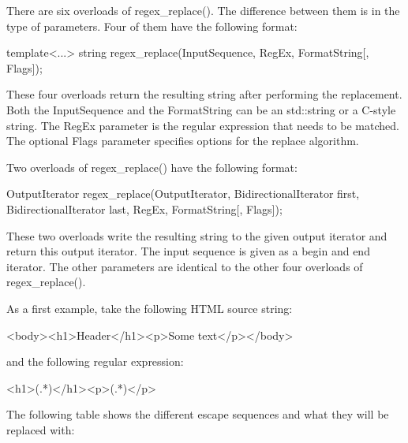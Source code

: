 There are six overloads of regex\_replace(). The difference between them is in the type of parameters. Four of them have the following format:

\begin{cpp}
template<...>
string regex_replace(InputSequence, RegEx, FormatString[, Flags]);
\end{cpp}

These four overloads return the resulting string after performing the replacement. Both the InputSequence and the FormatString can be an std::string or a C-style string. The RegEx parameter is the regular expression that needs to be matched. The optional Flags parameter specifies options for the replace algorithm.

Two overloads of regex\_replace() have the following format:

\begin{cpp}
OutputIterator regex_replace(OutputIterator,
                             BidirectionalIterator first,
                             BidirectionalIterator last,
                             RegEx, FormatString[, Flags]);
\end{cpp}

These two overloads write the resulting string to the given output iterator and return this output iterator. The input sequence is given as a begin and end iterator. The other parameters are identical to the other four overloads of regex\_replace().


As a first example, take the following HTML source string:

\begin{shell}
<body><h1>Header</h1><p>Some text</p></body>
\end{shell}

and the following regular expression:

\begin{cpp}
<h1>(.*)</h1><p>(.*)</p>
\end{cpp}

The following table shows the different escape sequences and what they will be replaced with:


